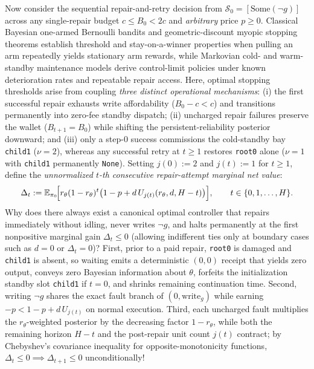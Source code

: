 \documentclass[11pt,a4paper]{article}
\begin{document}
Now consider the sequential repair-and-retry decision from
\(\mathcal{S}_0 = [\mathrm{Some}(\neg g)]\) across any single-repair
budget \(c \le B_0 < 2c\) and \emph{arbitrary} price \(p \ge 0\).
Classical Bayesian one-armed Bernoulli bandits \citep{berryFristedt1979}
and geometric-discount myopic stopping theorems
\citep{fristedtBerry1988} establish threshold and stay-on-a-winner
properties when pulling an arm repeatedly yields stationary arm rewards,
while Markovian cold- and warm-standby maintenance models
\citep{barronYechiali2017} derive control-limit policies under known
deterioration rates and repeatable repair access. Here, optimal stopping
thresholds arise from coupling \emph{three distinct operational
mechanisms}: (i) the first successful repair exhausts write
affordability (\(B_0 - c < c\)) and transitions permanently into
zero-fee standby dispatch; (ii) uncharged repair failures preserve the
wallet (\(B_{t+1} = B_0\)) while shifting the persistent-reliability
posterior downward; and (iii) only a step-\(0\) success commissions the
cold-standby bay \texttt{child1} (\(\nu = 2\)), whereas any successful
retry at \(t \ge 1\) restores \texttt{root0} alone (\(\nu = 1\) with
\texttt{child1} permanently \texttt{None}). Setting \(j(0) := 2\) and
\(j(t) := 1\) for \(t \ge 1\), define the \emph{unnormalized \(t\)-th
consecutive repair-attempt marginal net value}:
\[\Delta_t := \mathbb{E}_{\pi_0}\!\Bigl[r_\theta (1 - r_\theta)^t \bigl(1 - p + d\, U_{j(t)}(r_\theta, d, H - t)\bigr)\Bigr], \qquad t \in \{0, 1, \dots, H\}.\]
Why does there always exist a canonical optimal controller that repairs
immediately without idling, never writes \(\neg g\), and halts
permanently at the first nonpositive marginal gain \(\Delta_t \le 0\)
(allowing indifferent ties only at boundary cases such as \(d = 0\) or
\(\Delta_t = 0\))? First, prior to a paid repair, \texttt{root0} is
damaged and \texttt{child1} is absent, so waiting emits a deterministic
\((0,0)\) receipt that yields zero output, conveys zero Bayesian
information about \(\theta\), forfeits the initialization standby slot
\texttt{child1} if \(t = 0\), and shrinks remaining continuation time.
Second, writing \(\neg g\) shares the exact fault branch of
\((0, \mathrm{write}_g)\) while earning \(-p < 1 - p + d\,U_{j(t)}\) on
normal execution. Third, each uncharged fault multiplies the
\(r_\theta\)-weighted posterior by the decreasing factor
\(1 - r_\theta\), while both the remaining horizon \(H - t\) and the
post-repair unit count \(j(t)\) contract; by Chebyshev's covariance
inequality for opposite-monotonicity functions,
\(\Delta_t \le 0 \implies \Delta_{t+1} \le 0\) unconditionally!
\end{document}
